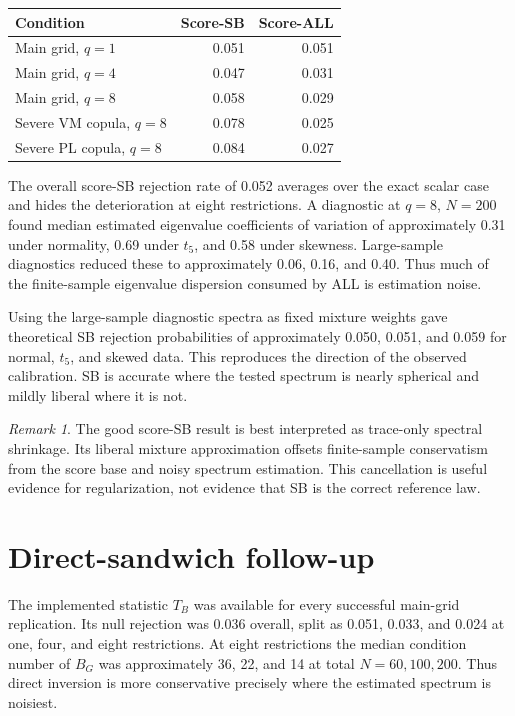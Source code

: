 \documentclass[11pt]{article}
\theoremstyle{plain}
\theoremstyle{remark}
\newtheorem*{remark}{Remark}
\begin{document}
\begin{center}
\begin{tabular}{lrr}
\toprule
Condition & Score-SB & Score-ALL \\
\midrule
Main grid, $q=1$ & 0.051 & 0.051 \\
Main grid, $q=4$ & 0.047 & 0.031 \\
Main grid, $q=8$ & 0.058 & 0.029 \\
Severe VM copula, $q=8$ & 0.078 & 0.025 \\
Severe PL copula, $q=8$ & 0.084 & 0.027 \\
\bottomrule
\end{tabular}
\end{center}

The overall score-SB rejection rate of 0.052 averages over the exact scalar
case and hides the deterioration at eight restrictions. A diagnostic at
$q=8$, $N=200$ found median estimated eigenvalue coefficients of variation of
approximately 0.31 under normality, 0.69 under $t_5$, and 0.58 under skewness.
Large-sample diagnostics reduced these to approximately 0.06, 0.16, and 0.40.
Thus much of the finite-sample eigenvalue dispersion consumed by ALL is
estimation noise.

Using the large-sample diagnostic spectra as fixed mixture weights gave
theoretical SB rejection probabilities of approximately 0.050, 0.051, and
0.059 for normal, $t_5$, and skewed data. This reproduces the direction of the
observed calibration. SB is accurate where the tested spectrum is nearly
spherical and mildly liberal where it is not.

\begin{remark}
The good score-SB result is best interpreted as trace-only spectral shrinkage.
Its liberal mixture approximation offsets finite-sample conservatism from the
score base and noisy spectrum estimation. This cancellation is useful evidence
for regularization, not evidence that SB is the correct reference law.
\end{remark}

\section*{Direct-sandwich follow-up}

The implemented statistic $T_B$ was available for every successful main-grid
replication. Its null rejection was 0.036 overall, split as 0.051, 0.033, and
0.024 at one, four, and eight restrictions. At eight restrictions the median
condition number of $B_G$ was approximately 36, 22, and 14 at total
$N=60,100,200$. Thus direct inversion is more conservative precisely where the
estimated spectrum is noisiest.
\end{document}
